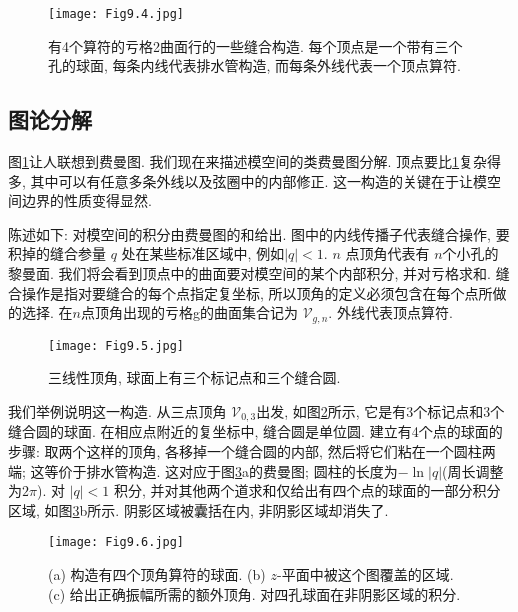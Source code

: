 \begin{figure}[h]
	\begin{center}
		\texttt{[image: Fig9.4.jpg]}
		\caption{有4个算符的亏格2曲面行的一些缝合构造. 每个顶点是一个带有三个孔的球面, 每条内线代表排水管构造, 而每条外线代表一个顶点算符.}\label{Fig9.4}
	\end{center}
\end{figure}

\subsection*{图论分解}

图\ref{Fig9.4}让人联想到费曼图. 我们现在来描述模空间的类费曼图分解. 顶点要比\ref{Fig9.4}复杂得多, 其中可以有任意多条外线以及弦圈中的内部修正. 
这一构造的关键在于让模空间边界的性质变得显然.

陈述如下: 对模空间的积分由费曼图的和给出. 图中的内线传播子代表缝合操作, 要积掉的缝合参量 $q$ 处在某些标准区域中, 例如$|q|<1 $.  
$n$ 点顶角代表有 $n$个小孔的黎曼面. 我们将会看到顶点中的曲面要对模空间的某个内部积分, 并对亏格求和. 
缝合操作是指对要缝合的每个点指定复坐标, 所以顶角的定义必须包含在每个点所做的选择. 在$n$点顶角出现的亏格g的曲面集合记为 $\mathscr{V}_{g,n}$. 
外线代表顶点算符.

\begin{figure}
	\begin{center}
		\texttt{[image: Fig9.5.jpg]}\\
		\caption{三线性顶角, 球面上有三个标记点和三个缝合圆.}\label{Fig9.5}
	\end{center}
\end{figure}

我们举例说明这一构造. 从三点顶角 $\mathscr{V}_{0,3}$出发, 如图\ref{Fig9.5}所示, 它是有3个标记点和3个缝合圆的球面. 
在相应点附近的复坐标中, 缝合圆是单位圆. 建立有4个点的球面的步骤: 取两个这样的顶角, 各移掉一个缝合圆的内部, 然后将它们粘在一个圆柱两端; 
这等价于排水管构造. 这对应于图\ref{Fig9.6}a的费曼图; 圆柱的长度为$-\ln |q|$(周长调整为$2\pi$). 对 $|q|<1$ 积分, 
并对其他两个道求和仅给出有四个点的球面的一部分积分区域, 如图\ref{Fig9.6}b所示. 阴影区域被囊括在内, 非阴影区域却消失了.

\begin{figure}[h]
	\begin{center}
		\texttt{[image: Fig9.6.jpg]}\\
		\caption{(a) 构造有四个顶角算符的球面. (b) $z$-平面中被这个图覆盖的区域. (c) 给出正确振幅所需的额外顶角. 对四孔球面在非阴影区域的积分.}\label{Fig9.6}
	\end{center}
\end{figure}

